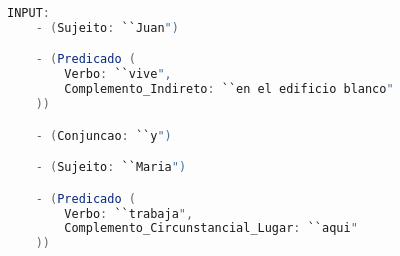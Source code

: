 \begin{center}
\begin{minipage}{13cm}
\begin{lstlisting}[language=java, basicstyle=\small, label={lst:example_complex_input2}, caption=Example of a complex sentence input]
INPUT:
    - (Sujeito: ``Juan")

    - (Predicado (
        Verbo: ``vive",
        Complemento_Indireto: ``en el edificio blanco"
    ))

    - (Conjuncao: ``y")

    - (Sujeito: ``Maria")

    - (Predicado (
        Verbo: ``trabaja",
        Complemento_Circunstancial_Lugar: ``aqui"
    ))
\end{lstlisting}
\end{minipage}
\end{center}
